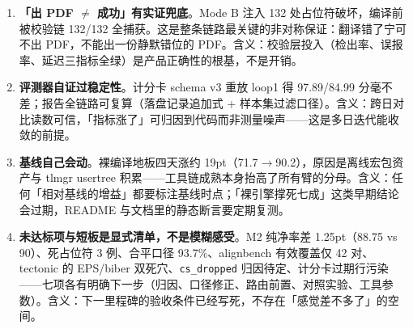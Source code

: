 \begin{enumerate}
  \item \textbf{「出 PDF $\neq$ 成功」有实证兜底}。Mode B 注入 132 处占位符破坏，编译前被校验链 132/132 全捕获。这是整条链路最关键的非对称保证：翻译错了宁可不出 PDF，不能出一份静默错位的 PDF。含义：校验层投入（检出率、误报率、延迟三指标全绿）是产品正确性的根基，不是开销。

  \item \textbf{评测器自证过稳定性}。计分卡 schema v3 重放 loop1 得 97.89/84.99 分毫不差；报告全链路可复算（落盘记录追加式 + 样本集过滤口径）。含义：跨日对比读数可信，「指标涨了」可归因到代码而非测量噪声——这是多日迭代能收敛的前提。

  \item \textbf{基线自己会动}。裸编译地板四天涨约 19pt（71.7$\to$90.2），原因是离线宏包资产与 tlmgr usertree 积累——工具链成熟本身抬高了所有臂的分母。含义：任何「相对基线的增益」都要标注基线时点；「裸引擎撑死七成」这类早期结论会过期，README 与文档里的静态断言要定期复测。

  \item \textbf{未达标项与短板是显式清单，不是模糊感受}。M2 纯净率差 1.25pt（88.75 vs 90）、死占位符 3 例、合平口径 93.7\%、alignbench 有效覆盖仅 42 对、tectonic 的 EPS/biber 双死穴、\texttt{cs\_dropped} 归因待定、计分卡过期行污染——七项各有明确下一步（归因、口径修正、路由前置、对照实验、工具参数）。含义：下一里程碑的验收条件已经写死，不存在「感觉差不多了」的空间。
\end{enumerate}
